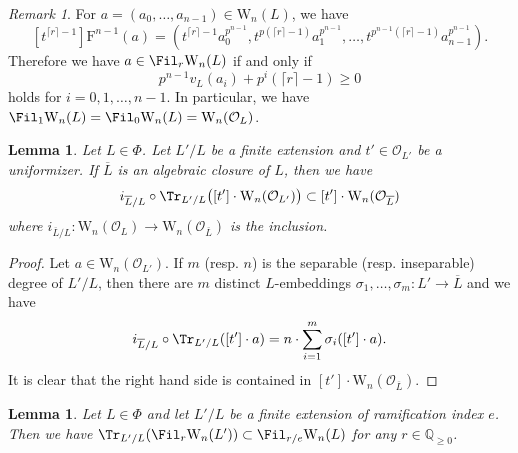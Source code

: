 \documentclass{amsart}
\theoremstyle{plain}
\newtheorem{lemma}[theorem]{Lemma}
\theoremstyle{definition}
\theoremstyle{remark}
\newtheorem{remark}[theorem]{Remark}
\numberwithin{equation}{section}
\def\ceil#1{\lceil #1 \rceil}
\begin{document}
\begin{remark}\label{Witt_filtration_valuation}
	For $a=(a_0,\dots,a_{n-1})\in \mathrm{W}_n(L)$, we have
	$$
		[t^{\ceil{r}-1}]\mathrm{F}^{n-1}(a)=(t^{\ceil{r}-1}a_0^{p^{n-1}},t^{p(\ceil{r}-1)}a_1^{p^{n-1}},\dots,t^{p^{n-1}(\ceil{r}-1)}a_{n-1}^{p^{n-1}}).
	$$
	Therefore we have $a\in \Fil_r \mathrm{W}_n(L)$ if and only if
	$$
		p^{n-1}v_L(a_i) +  p^i (\ceil{r}-1) \geq 0
	$$
	holds for $i=0,1,\dots,n-1$.
	In particular, we have $\Fil_1\mathrm{W}_n(L)=\Fil_0\mathrm{W}_n(L)=\mathrm{W}_n(\mathcal{O}_L)$.
\end{remark}

\begin{lemma}\label{Witt_trace}
	Let $L\in \Phi$.
	Let $L'/L$ be a finite extension and $t'\in \mathcal{O}_{L'}$ be a uniformizer.
	If $\overline{L}$ is an algebraic closure of $L$, then we have
	$$i_{\overline{L}/L}\circ \Tr_{L'/L}\bigl([t']\cdot \mathrm{W}_n(\mathcal{O}_{L'})\bigr)\subset [t']\cdot \mathrm{W}_n(\mathcal{O}_{\overline{L}})$$
	where $i_{\overline{L}/L}\colon \mathrm{W}_n(\mathcal{O}_L)\to \mathrm{W}_n(\mathcal{O}_{\overline{L}})$ is the inclusion.
\end{lemma}

\begin{proof}
	Let $a\in \mathrm{W}_n(\mathcal{O}_{L'})$.
	If $m$ (resp. $n$) is the separable (resp. inseparable) degree of $L'/L$, then there are $m$ distinct $L$-embeddings $\sigma_1,\dots,\sigma_m\colon L'\to \overline{L}$ and we have
	$$
		i_{\overline{L}/L}\circ \Tr_{L'/L}([t']\cdot a)=n\cdot \sum_{i=1}^m\sigma_i([t']\cdot a).
	$$
	It is clear that the right hand side is contained in $[t']\cdot \mathrm{W}_n(\mathcal{O}_{\overline{L}})$.
\end{proof}

\begin{lemma}\label{Witt_trace_axiom}
	Let $L\in \Phi$ and let $L'/L$ be a finite extension of ramification index $e$.
	Then we have $\Tr_{L'/L}(\Fil_r \mathrm{W}_n(L'))\subset \Fil_{r/e}\mathrm{W}_n(L)$ for any $r\in \mathbb{Q}_{\geq 0}$.
\end{lemma}
\end{document}
